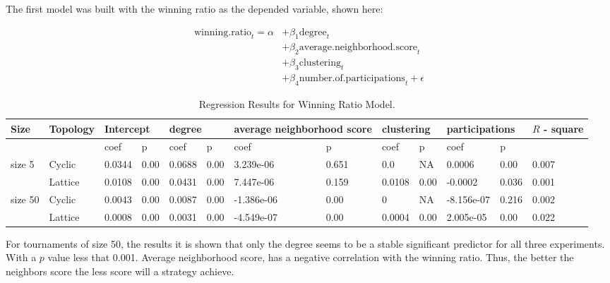 The first model was built with the winning ratio as the depended variable,
shown here:

\begin{align}
	\mathrm{winning.ratio}_{t} = \alpha
	  & + \beta_{1}  \mathrm{degree}_{t}                              \\
	  & + \beta_{2}  \mathrm{average.neighborhood.score}_{t}          \\
	  & + \beta_{3}  \mathrm{clustering}_{t}                          \\
	  & + \beta_{4}  \mathrm{number.of.participations}_{t} + \epsilon
\end{align}

\begin{table}[!hbtp]
	\centering
	\begin{adjustbox}{width=1\textwidth}
		\small
		\begin{tabular}{@{}|l|l|l|l|l|l|l|l|l|l|l|l|l|@{}}
			\toprule
			Size & Topology & \multicolumn{2}{l|}{Intercept} & \multicolumn{2}{l|}{degree} & \multicolumn{2}{l|}{average neighborhood score} & \multicolumn{2}{l|}{clustering} & \multicolumn{2}{l|}{participations} & \(R\) - square \\ \midrule
			        &         & coef   & p    & coef   & p    & coef       & p     & coef   & p    & coef       & p     &       \\ \midrule
			size 5  & Cyclic  & 0.0344 & 0.00 & 0.0688 & 0.00 & 3.239e-06  & 0.651 & 0.0    & NA   & 0.0006     & 0.00  & 0.007 \\ \midrule
			        & Lattice & 0.0108 & 0.00 & 0.0431 & 0.00 & 7.447e-06  & 0.159 & 0.0108 & 0.00 & -0.0002    & 0.036 & 0.001 \\ \midrule
			size 50 & Cyclic  & 0.0043 & 0.00 & 0.0087 & 0.00 & -1.386e-06 & 0.00  & 0      & NA   & -8.156e-07 & 0.216 & 0.002 \\ \midrule
			        & Lattice & 0.0008 & 0.00 & 0.0031 & 0.00 & -4.549e-07 & 0.00  & 0.0004 & 0.00 & 2.005e-05  & 0.00  & 0.022 \\ \bottomrule
		\end{tabular}
	\end{adjustbox}
	\caption{Regression Results for Winning Ratio Model.}
	\label{regression-winning}
\end{table}

For tournaments of size 50, the results it is shown that only the degree seems
to be a stable significant predictor for all three experiments. With a \(p\)
value less that 0.001. Average neighborhood score, has a negative correlation
with the winning ratio. Thus, the
better the neighbors score the less score will a strategy achieve.

